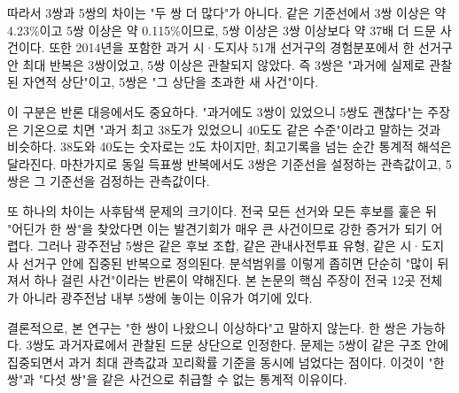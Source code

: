 \documentclass[preprint]{IEIE}
\begin{document}
\begin{table}[t]
\centering
\scriptsize
{}
\end{table}

따라서 3쌍과 5쌍의 차이는 "두 쌍 더 많다"가 아니다. 같은 기준선에서 3쌍 이상은 약 4.23\%이고 5쌍 이상은 약 0.115\%이므로, 5쌍 이상은 3쌍 이상보다 약 37배 더 드문 사건이다. 또한 2014년을 포함한 과거 시·도지사 51개 선거구의 경험분포에서 한 선거구 안 최대 반복은 3쌍이었고, 5쌍 이상은 관찰되지 않았다. 즉 3쌍은 "과거에 실제로 관찰된 자연적 상단"이고, 5쌍은 "그 상단을 초과한 새 사건"이다.

이 구분은 반론 대응에서도 중요하다. "과거에도 3쌍이 있었으니 5쌍도 괜찮다"는 주장은 기온으로 치면 "과거 최고 38도가 있었으니 40도도 같은 수준"이라고 말하는 것과 비슷하다. 38도와 40도는 숫자로는 2도 차이지만, 최고기록을 넘는 순간 통계적 해석은 달라진다. 마찬가지로 동일 득표쌍 반복에서도 3쌍은 기준선을 설정하는 관측값이고, 5쌍은 그 기준선을 검정하는 관측값이다.

또 하나의 차이는 사후탐색 문제의 크기이다. 전국 모든 선거와 모든 후보를 훑은 뒤 "어딘가 한 쌍"을 찾았다면 이는 발견기회가 매우 큰 사건이므로 강한 증거가 되기 어렵다. 그러나 광주전남 5쌍은 같은 후보 조합, 같은 관내사전투표 유형, 같은 시·도지사 선거구 안에 집중된 반복으로 정의된다. 분석범위를 이렇게 좁히면 단순히 "많이 뒤져서 하나 걸린 사건"이라는 반론이 약해진다. 본 논문의 핵심 주장이 전국 12곳 전체가 아니라 광주전남 내부 5쌍에 놓이는 이유가 여기에 있다.

결론적으로, 본 연구는 "한 쌍이 나왔으니 이상하다"고 말하지 않는다. 한 쌍은 가능하다. 3쌍도 과거자료에서 관찰된 드문 상단으로 인정한다. 문제는 5쌍이 같은 구조 안에 집중되면서 과거 최대 관측값과 꼬리확률 기준을 동시에 넘었다는 점이다. 이것이 "한 쌍"과 "다섯 쌍"을 같은 사건으로 취급할 수 없는 통계적 이유이다.
\end{document}
